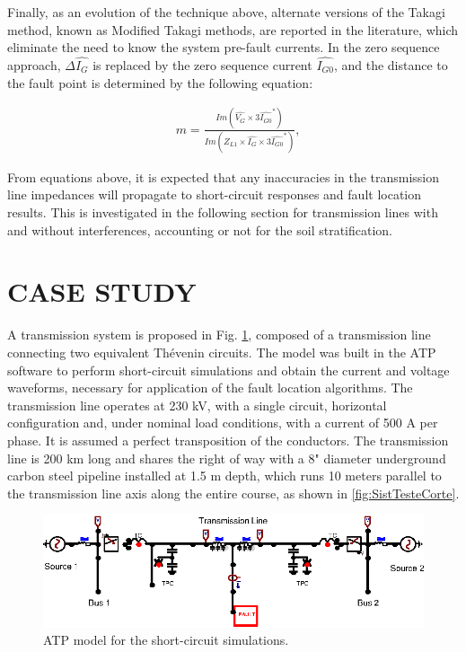 \documentclass[conference]{IEEEtran}
\begin{document}
Finally, as an evolution of the technique above, alternate versions of the Takagi method, known as Modified Takagi methods, are reported in the literature, which eliminate the need to know the system pre-fault currents. In the zero sequence approach, $\Delta\widehat{I_G}$ is replaced by the zero sequence current $\widehat{I_{G0}}$, and the distance to the fault point is determined by the following equation:

\begin{equation}\label{eq:mTakagiMod}
	\begin{aligned}
		&m=\frac{Im(\widehat{V_G}\times3\widehat{I_{G0}}^*)}{Im(Z_{L1}\times\widehat{I_G}\times3\widehat{I_{G0}}^*)},
	\end{aligned}
\end{equation}

From equations above, it is expected that any inaccuracies in the transmission line impedances will propagate to short-circuit responses and fault location results. This is investigated in the following section for transmission lines with and without interferences, accounting or not for the soil stratification.


\section{CASE STUDY}

 A transmission system is proposed in Fig. \ref{fig:Sistema230kV}, composed of a transmission line connecting two equivalent Thévenin circuits. The model was built in the ATP software to perform short-circuit simulations and obtain the current and voltage waveforms, necessary for application of the fault location algorithms. The transmission line operates at 230 kV, with a single circuit, horizontal configuration and, under nominal load conditions, with a current of 500 A per phase. It is assumed a perfect transposition of the conductors. The transmission line is 200 km long and shares the right of way with a 8" diameter underground carbon steel pipeline installed at 1.5 m depth, which runs 10 meters parallel to the transmission line axis along the entire course, as shown in \ref{fig:SistTesteCorte}. 
\begin{figure}[hbt]
	\begin{center}
		\includegraphics[width=1\columnwidth]{./fig/Sistema230kV.eps}
		\caption{ATP model for the short-circuit simulations.}
		\label{fig:Sistema230kV}
	\end{center}
\end{figure}
\end{document}
